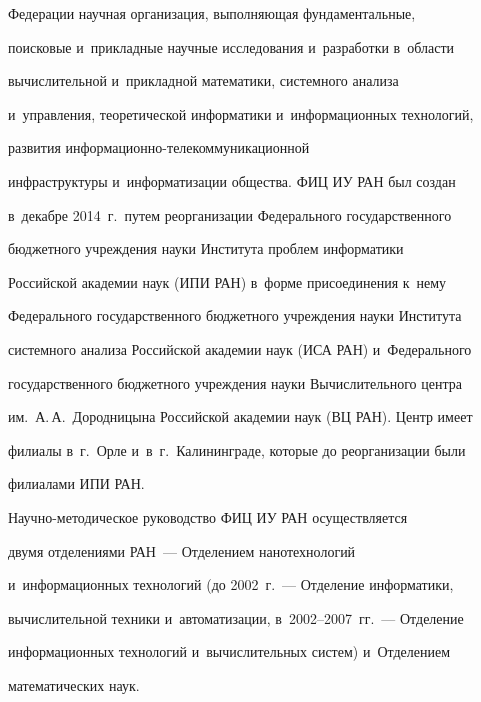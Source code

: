 Федерации научная организация, вы\-пол\-ня\-ющая фундаментальные, 

поисковые и~при\-клад\-ные научные исследования и~разработки в~об\-ласти 

вычислительной и~при\-клад\-ной математики, сис\-тем\-но\-го анализа 

и~управ\-ле\-ния, тео\-ре\-ти\-че\-ской информатики и~информационных технологий, 

развития ин\-фор\-ма\-ци\-он\-но-те\-ле\-ком\-му\-ни\-ка\-ци\-он\-ной 

инфраструктуры и~информатизации общества. ФИЦ ИУ РАН был создан 

в~декабре 2014~г.\ путем реорганизации Федерального государственного 

бюд\-жет\-но\-го учреж\-де\-ния науки Института проб\-лем информатики 

Российской академии наук (ИПИ РАН) в~форме при\-со\-еди\-не\-ния к~нему 

Федерального государственного бюджетного учреж\-де\-ния науки Института 

сис\-тем\-но\-го анализа Российской академии наук (ИСА РАН) и~Федерального 

государственного бюджетного учреж\-де\-ния науки Вы\-чис\-ли\-тель\-но\-го цент\-ра 

им.\ А.\,А.~Дородницына Российской академии наук (ВЦ РАН). Центр имеет 

филиалы в~г.~Орле и~в~г.~Калининграде, которые до реорганизации были 

филиалами ИПИ РАН.  

На\-уч\-но-ме\-то\-ди\-че\-ское руководство ФИЦ ИУ РАН осуществляется 

двумя отделениями РАН~--- Отделением нанотехнологий 

и~информационных технологий (до 2002~г.~--- Отделение информатики, 

вы\-чис\-ли\-тель\-ной техники и~автоматизации, в~2002--2007~гг.~--- Отделение 

информационных технологий и~вы\-чис\-ли\-тель\-ных сис\-тем) и~Отделением 

математических наук. 

   

